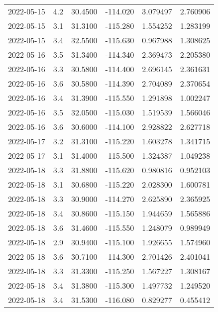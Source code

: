 \begin{tabular}{lrrrrr}
2022-05-15 &       4.2 &  30.4500 &  -114.020 &         3.079497 &         2.760906 \\
2022-05-15 &       3.1 &  31.3100 &  -115.280 &         1.554252 &         1.283199 \\
2022-05-15 &       3.4 &  32.5500 &  -115.630 &         0.967988 &         1.308625 \\
2022-05-16 &       3.5 &  31.3400 &  -114.340 &         2.369473 &         2.205380 \\
2022-05-16 &       3.3 &  30.5800 &  -114.400 &         2.696145 &         2.361631 \\
2022-05-16 &       3.6 &  30.5800 &  -114.390 &         2.704089 &         2.370654 \\
2022-05-16 &       3.4 &  31.3900 &  -115.550 &         1.291898 &         1.002247 \\
2022-05-16 &       3.5 &  32.0500 &  -115.030 &         1.519539 &         1.566046 \\
2022-05-16 &       3.6 &  30.6000 &  -114.100 &         2.928822 &         2.627718 \\
2022-05-17 &       3.2 &  31.3100 &  -115.220 &         1.603278 &         1.341715 \\
2022-05-17 &       3.1 &  31.4000 &  -115.500 &         1.324387 &         1.049238 \\
2022-05-18 &       3.3 &  31.8800 &  -115.620 &         0.980816 &         0.952103 \\
2022-05-18 &       3.1 &  30.6800 &  -115.220 &         2.028300 &         1.600781 \\
2022-05-18 &       3.3 &  30.9000 &  -114.270 &         2.625890 &         2.365925 \\
2022-05-18 &       3.4 &  30.8600 &  -115.150 &         1.944659 &         1.565886 \\
2022-05-18 &       3.6 &  31.4600 &  -115.550 &         1.248079 &         0.989949 \\
2022-05-18 &       2.9 &  30.9400 &  -115.100 &         1.926655 &         1.574960 \\
2022-05-18 &       3.6 &  30.7100 &  -114.300 &         2.701426 &         2.401041 \\
2022-05-18 &       3.3 &  31.3300 &  -115.250 &         1.567227 &         1.308167 \\
2022-05-18 &       3.4 &  31.3800 &  -115.300 &         1.497732 &         1.249520 \\
2022-05-18 &       3.4 &  31.5300 &  -116.080 &         0.829277 &         0.455412 \\

\end{tabular}
